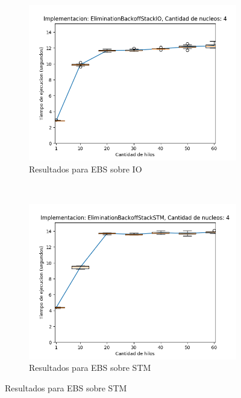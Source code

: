 \begin{appendices}
\begin{figure}[t]
    \centering
    \begin{subfigure}[b]{0.49\textwidth}
        \includegraphics[width=\textwidth]{images/numberOfThreadsDist/plots/expEBSIO-4}
        \caption{Resultados para EBS sobre IO}
        \label{subfig:numberOfThreadsDist-ebsio-4}
    \end{subfigure}
    ~
    \begin{subfigure}[b]{0.49\textwidth}
        \includegraphics[width=\textwidth]{images/numberOfThreadsDist/plots/expEBSSTM-4}
        \caption{Resultados para EBS sobre STM}
        \label{subfig:numberOfThreadsDist-ebsstm-4}
    \end{subfigure}

\end{figure}
\end{appendices}
